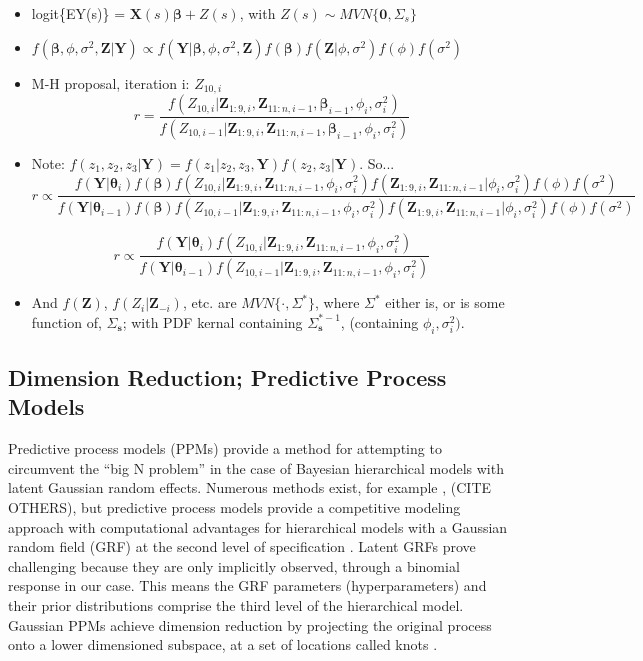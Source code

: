 \documentclass{article}
\begin{document}
\begin{itemize}
\item logit\{EY(s)\} = $\pmb{X}(s)\pmb{\beta} + Z(s)$, with $Z(s) \sim MVN\{\pmb{0}, \Sigma_{s}\}$
\item $f(\pmb{\beta}, \phi, \sigma^{2}, \pmb{Z}|\pmb{Y}) \propto f(\pmb{Y}|\pmb{\beta}, \phi, \sigma^{2}, \pmb{Z})f(\pmb{\beta})f(\pmb{Z}|\phi, \sigma^{2})f(\phi)f(\sigma^{2})$
\item M-H proposal, iteration i: $Z_{10,i}$
$$ r = \frac{ f(Z_{10,i}|\pmb{Z}_{1:9,i},\pmb{Z}_{11:n,i-1}, \pmb{\beta}_{i-1}, \phi_{i}, \sigma^{2}_{i})}{f(Z_{10,i-1}|\pmb{Z}_{1:9,i},\pmb{Z}_{11:n,i-1}, \pmb{\beta}_{i-1}, \phi_{i}, \sigma^{2}_{i})} $$
 
\item Note: $f(z_{1}, z_{2}, z_{3}|\pmb{Y}) = f(z_{1}|z_{2},z_{3},\pmb{Y})f(z_{2},z_{3}|\pmb{Y})$. So... $$r \propto \frac{f(\pmb{Y}|\pmb{\theta}_{i})f(\pmb{\beta})f(Z_{10,i}|\pmb{Z}_{1:9,i},\pmb{Z}_{11:n,i-1}, \phi_{i}, \sigma^{2}_{i})f(\pmb{Z}_{1:9,i},\pmb{Z}_{11:n,i-1}|\phi_{i}, \sigma^{2}_{i})f(\phi)f(\sigma^{2})} {f(\pmb{Y}|\pmb{\theta}_{i-1})f(\pmb{\beta})f(Z_{10,i-1}|\pmb{Z}_{1:9,i},\pmb{Z}_{11:n,i-1}, \phi_{i}, \sigma^{2}_{i})f(\pmb{Z}_{1:9,i},\pmb{Z}_{11:n,i-1}|\phi_{i}, \sigma^{2}_{i})f(\phi)f(\sigma^{2})}$$

$$ r \propto \frac{f(\pmb{Y}|\pmb{\theta}_{i})f(Z_{10,i}|\pmb{Z}_{1:9,i},\pmb{Z}_{11:n,i-1}, \phi_{i}, \sigma^{2}_{i})}
{f(\pmb{Y}|\pmb{\theta}_{i-1})f(Z_{10,i-1}|\pmb{Z}_{1:9,i},\pmb{Z}_{11:n,i-1}, \phi_{i}, \sigma^{2}_{i})} $$

\item And $f(\pmb{Z})$, $f(Z_{i}|\pmb{Z}_{-i})$, etc. are $MVN\{\cdot,\Sigma^{*}\}$, where $\Sigma^{*}$ either is, or is some function of, $\Sigma_{\pmb{s}}$; with PDF kernal containing $\Sigma_{\pmb{s}}^{*-1}$, (containing $\phi_{i}, \sigma^{2}_{i})$.

\end{itemize}

\subsection{Dimension Reduction; Predictive Process Models} %

Predictive process models (PPMs) provide a method for attempting to circumvent the ``big N problem'' in the case of Bayesian hierarchical models with latent Gaussian random effects. Numerous methods exist, for example \citep{Cressie2008}, (CITE OTHERS), but predictive process models provide a competitive modeling approach with computational advantages for hierarchical models with a Gaussian random field (GRF) at the second level of specification \citep{Banerjee2008}. Latent GRFs prove challenging because they are only implicitly observed, through a binomial response in our case. This means the GRF parameters (hyperparameters) and their prior distributions comprise the third level of the hierarchical model. Gaussian PPMs achieve dimension reduction by projecting the original process onto a lower dimensioned subspace, at a set of locations called knots \citep{Banerjee2008}. 
\end{document}
